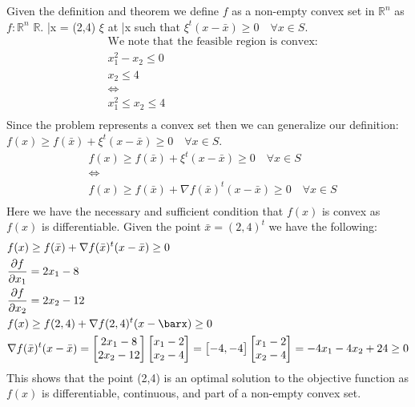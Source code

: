 \documentclass[12pt]{article}
\newcommand{\R}{\mathbb{R}}
\begin{document}
Given the definition and theorem we define $f$ as a non-empty convex set in $\R^n$ as $f:
\R^n$ \rightarrow $\R$. \bar x = (2,4) \in {}$\xi$ at \bar x such that $\xi^t (x-\bar x) \geq 0 \quad \forall x \in S$.
    \begin{align*}
        &\text{We note that the feasible region is convex:}\\
        &x_1^2 - x_2 \leq 0 \\ 
        &x_2 \leq 4\\
        &\Leftrightarrow \\ 
        &x_1^2 \leq x_2 \leq 4\\
    \end{align*}
Since the problem represents a convex set then we can generalize our definition:\\
$f(x) \geq f(\bar x) + \xi^t (x-\bar x) \geq 0 \quad \forall x \in S$.\\
    \begin{align*}
        &f(x) \geq f(\bar x) + \xi^t (x-\bar x) \geq 0 \quad \forall x \in S\\
        &\Leftrightarrow\\
        &f(x) \geq f(\bar x) + \nabla f(\bar x)^t (x-\bar x) \geq 0 \quad \forall x \in S\\
    \end{align*}
Here we have the necessary and sufficient condition that $f(x)$ is convex as  $f(x)$ is differentiable. Given the point $\bar x = (2,4)^t$ we have the following:\\
    \begin{align*}
        &f(x) \geq f(\bar x) + \nabla f(\bar x)^t (x-\bar x) \geq 0 \\
        &\frac{\partial f}{\partial x_1} = 2x_1 -8\\
        &\frac{\partial f}{\partial x_2} = 2x_2 -12 \\
        &f(x) \geq f(2,4) + \nabla f(2,4)^t (x-\barx) \geq 0\\
        &\nabla f(\bar x) ^t (x-\bar x) = 
            \begin{bmatrix} 
                2x_1 -8 \\
                2x_2 -12
            \end{bmatrix}
            \begin{bmatrix} 
                x_1 -2 \\
                x_2 -4
            \end{bmatrix}
            =
            \begin{bmatrix} 
                -4 ,
                -4
            \end{bmatrix}
            \begin{bmatrix} 
                x_1 -2 \\
                x_2 -4
            \end{bmatrix}
            =
            -4x_1 - 4x_2 + 24 \geq 0 \\
    \end{align*}
This shows that the point (2,4) is an optimal solution to the objective function as $f(x)$ is differentiable, continuous, and part of a non-empty convex set. 
\end{document}
